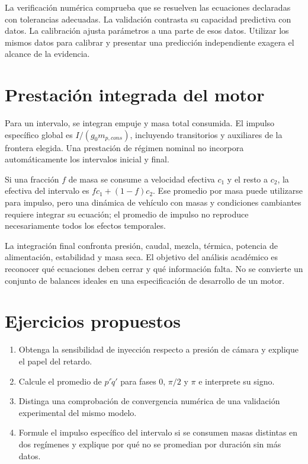 La verificación numérica comprueba que se resuelven las ecuaciones declaradas con tolerancias adecuadas. La validación contrasta su capacidad predictiva con datos. La calibración ajusta parámetros a una parte de esos datos. Utilizar los mismos datos para calibrar y presentar una predicción independiente exagera el alcance de la evidencia.
\section{Prestación integrada del motor}
Para un intervalo, se integran empuje y masa total consumida. El impulso específico global es $I/(g_0m_{p,cons})$, incluyendo transitorios y auxiliares de la frontera elegida. Una prestación de régimen nominal no incorpora automáticamente los intervalos inicial y final.

Si una fracción $f$ de masa se consume a velocidad efectiva $c_1$ y el resto a $c_2$, la efectiva del intervalo es $fc_1+(1-f)c_2$. Ese promedio por masa puede utilizarse para impulso, pero una dinámica de vehículo con masas y condiciones cambiantes requiere integrar su ecuación; el promedio de impulso no reproduce necesariamente todos los efectos temporales.

La integración final confronta presión, caudal, mezcla, térmica, potencia de alimentación, estabilidad y masa seca. El objetivo del análisis académico es reconocer qué ecuaciones deben cerrar y qué información falta. No se convierte un conjunto de balances ideales en una especificación de desarrollo de un motor.
\section{Ejercicios propuestos}
\begin{enumerate}
\item Obtenga la sensibilidad de inyección respecto a presión de cámara y explique el papel del retardo.
\item Calcule el promedio de $p'\dot q'$ para fases 0, $\pi/2$ y $\pi$ e interprete su signo.
\item Distinga una comprobación de convergencia numérica de una validación experimental del mismo modelo.
\item Formule el impulso específico del intervalo si se consumen masas distintas en dos regímenes y explique por qué no se promedian por duración sin más datos.
\end{enumerate}

